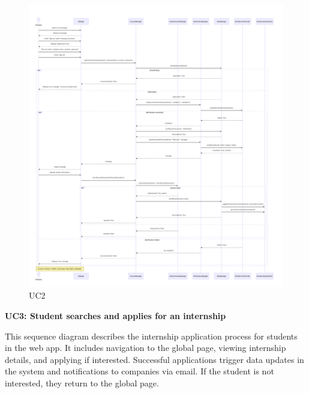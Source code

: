\begin{figure}[H]
    \centering
    \includegraphics[width=1.1\linewidth]{DD//Images/SequenceDiagrams/UC2}
    \caption{UC2}
\end{figure}

\newpage
\textbf{UC3: Student searches and applies for an internship}

This sequence diagram describes the internship application process for students in the web app. It includes navigation to the global page, viewing internship details, and applying if interested. Successful applications trigger data updates in the system and notifications to companies via email. If the student is not interested, they return to the global page. 


